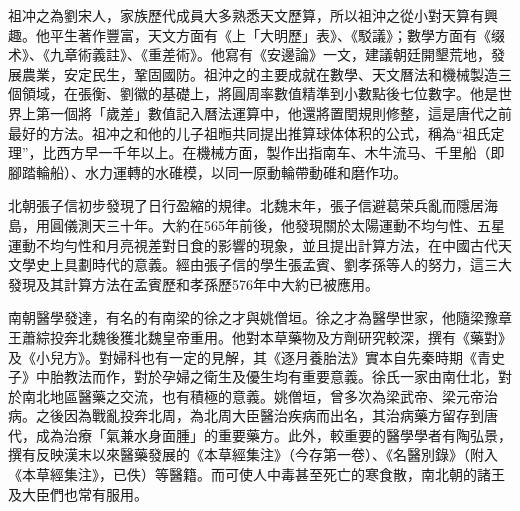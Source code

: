 祖冲之為劉宋人，家族歷代成員大多熟悉天文歷算，所以祖沖之從小對天算有興趣。他平生著作豐富，天文方面有《上「大明歷」表》、《駁議》；數學方面有《缀术》、《九章術義註》、《重差術》。他寫有《安邊論》一文，建議朝廷開墾荒地，發展農業，安定民生，鞏固國防。祖沖之的主要成就在數學、天文曆法和機械製造三個領域，在張衡、劉徽的基礎上，將圓周率數值精準到小數點後七位數字。他是世界上第一個將「歲差」數值記入曆法運算中，他還將置閏規則修整，這是唐代之前最好的方法。祖冲之和他的儿子祖暅共同提出推算球体体积的公式，稱為“祖氏定理”，比西方早一千年以上。在機械方面，製作出指南车、木牛流马、千里船（即腳踏輪船）、水力運轉的水碓模，以同一原動輪帶動碓和磨作功。

北朝張子信初步發現了日行盈縮的規律。北魏末年，張子信避葛荣兵亂而隱居海島，用圓儀測天三十年。大約在565年前後，他發現關於太陽運動不均勻性、五星運動不均勻性和月亮視差對日食的影響的現象，並且提出計算方法，在中國古代天文學史上具劃時代的意義。經由張子信的學生張孟賓、劉孝孫等人的努力，這三大發現及其計算方法在孟賓歷和孝孫歷576年中大約已被應用。

南朝醫學發達，有名的有南梁的徐之才與姚僧垣。徐之才為醫學世家，他隨梁豫章王蕭綜投奔北魏後獲北魏皇帝重用。他對本草藥物及方劑研究較深，撰有《藥對》及《小兒方》。對婦科也有一定的見解，其《逐月養胎法》實本自先秦時期《青史子》中胎教法而作，對於孕婦之衛生及優生均有重要意義。徐氏一家由南仕北，對於南北地區醫藥之交流，也有積極的意義。姚僧垣，曾多次為梁武帝、梁元帝治病。之後因為戰亂投奔北周，為北周大臣醫治疾病而出名，其治病藥方留存到唐代，成為治療「氣兼水身面腫」的重要藥方。此外，較重要的醫學學者有陶弘景，撰有反映漢末以來醫藥發展的《本草經集注》（今存第一卷）、《名醫別錄》（附入《本草經集注》，已佚）等醫籍。而可使人中毒甚至死亡的寒食散，南北朝的諸王及大臣們也常有服用。











